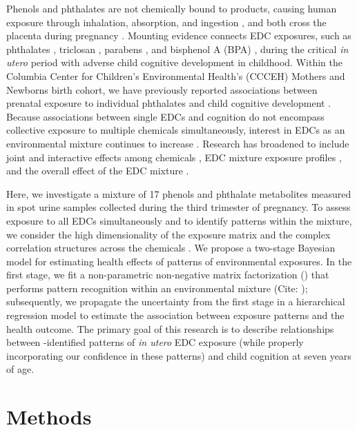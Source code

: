 Phenols and phthalates are not chemically bound to products, causing human exposure through inhalation, absorption, and ingestion \citep{vandenberg2007human}, and both cross the placenta during pregnancy \citep{schonfelder2002parent, mose2007phthalate}. Mounting evidence connects EDC exposures, such as phthalates \citep{van2020phthalate, nidens2020prenatal, kim2018association, doherty2017prenatal, kim2011prenatal}, triclosan \citep{jackson2018identifying, guo2020early}, parabens \citep{freire2020association}, and bisphenol A (BPA) \citep{jiang2020prenatal, lin2017prenatal}, during the critical \textit{in utero} period with adverse child cognitive development in childhood. Within the Columbia Center for Children’s Environmental Health's (CCCEH) Mothers and Newborns birth cohort, we have previously reported associations between prenatal exposure to individual phthalates and child cognitive development \citep{factor2014persistent, whyatt2012maternal}. Because associations between single EDCs and cognition do not encompass collective exposure to multiple chemicals simultaneously, interest in EDCs as an environmental mixture continues to increase \citep{braun2016can, taylor16}. Research has broadened to include joint and interactive effects among chemicals \citep{hu2021prenatal}, EDC mixture exposure profiles \citep{kalloo2021chemical}, and the overall effect of the EDC mixture \citep{tanner2020early}.

Here, we investigate a mixture of 17 phenols and phthalate metabolites measured in spot urine samples collected during the third trimester of pregnancy. To assess exposure to all EDCs simultaneously and to identify patterns within the mixture, we consider the high dimensionality of the exposure matrix and the complex correlation structures across the chemicals \citep{taylor16}. We propose a two-stage Bayesian model for estimating health effects of patterns of environmental exposures. In the first stage, we fit a non-parametric non-negative matrix factorization (\bnmfc) that performs pattern recognition within an environmental mixture (Cite: \bnmfc); subsequently, we propagate the uncertainty from the first stage in a hierarchical regression model to estimate the association between exposure patterns and the health outcome. The primary goal of this research is to describe relationships between \bnmfc-identified patterns of \textit{in utero} EDC exposure (while properly incorporating our confidence in these patterns) and child cognition at seven years of age.

\section{Methods}

